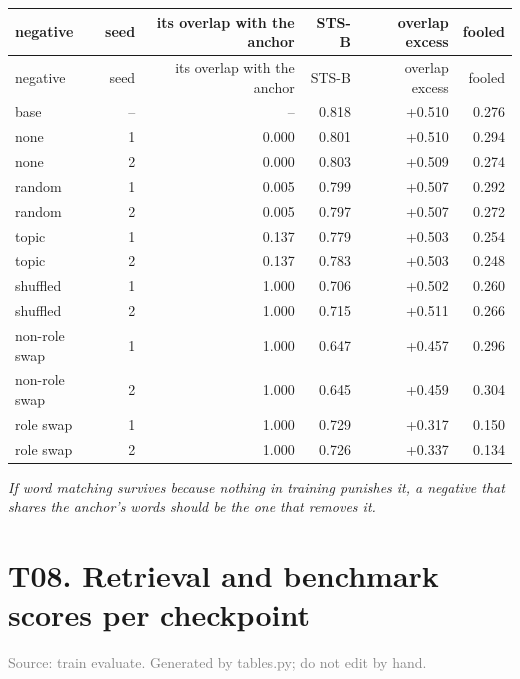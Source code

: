 \documentclass[10pt]{article}
\begin{document}
\footnotesize
\begin{longtable}{lrrrrr}
\toprule
negative & seed & its overlap with the anchor & STS-B & overlap excess & fooled \\
\midrule
\endfirsthead
\toprule
negative & seed & its overlap with the anchor & STS-B & overlap excess & fooled \\
\midrule
\endhead
\bottomrule
\endfoot
base & -- & -- & 0.818 & +0.510 & 0.276 \\
none & 1 & 0.000 & 0.801 & +0.510 & 0.294 \\
none & 2 & 0.000 & 0.803 & +0.509 & 0.274 \\
random & 1 & 0.005 & 0.799 & +0.507 & 0.292 \\
random & 2 & 0.005 & 0.797 & +0.507 & 0.272 \\
topic & 1 & 0.137 & 0.779 & +0.503 & 0.254 \\
topic & 2 & 0.137 & 0.783 & +0.503 & 0.248 \\
shuffled & 1 & 1.000 & 0.706 & +0.502 & 0.260 \\
shuffled & 2 & 1.000 & 0.715 & +0.511 & 0.266 \\
non-role swap & 1 & 1.000 & 0.647 & +0.457 & 0.296 \\
non-role swap & 2 & 1.000 & 0.645 & +0.459 & 0.304 \\
role swap & 1 & 1.000 & 0.729 & +0.317 & 0.150 \\
role swap & 2 & 1.000 & 0.726 & +0.337 & 0.134 \\
\end{longtable}
\normalsize

\textit{If word matching survives because nothing in training punishes it, a negative that shares the anchor's words should be the one that removes it.}
\clearpage

\section*{T08. Retrieval and benchmark scores per checkpoint}
\textcolor{gray}{Source: train evaluate. Generated by tables.py; do not edit by hand.}
\end{document}

